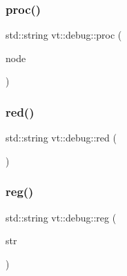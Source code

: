 \mbox{\label{namespacevt_1_1debug_a13a11e278ff8e5a4093396437511aeb7}} 
\subsubsection{\texorpdfstring{proc()}{proc()}}
{\footnotesize\ttfamily std\+::string vt\+::debug\+::proc (\begin{DoxyParamCaption}\item[{\hyperlink{namespacevt_a866da9d0efc19c0a1ce79e9e492f47e2}{vt\+::\+Node\+Type} const \&}]{node }\end{DoxyParamCaption})\hspace{0.3cm}{\ttfamily [inline]}}

\mbox{\label{namespacevt_1_1debug_a6b162f2ca1d964d7cf05c4079d5554a0}} 
\subsubsection{\texorpdfstring{red()}{red()}}
{\footnotesize\ttfamily std\+::string vt\+::debug\+::red (\begin{DoxyParamCaption}{ }\end{DoxyParamCaption})\hspace{0.3cm}{\ttfamily [inline]}}

\mbox{\label{namespacevt_1_1debug_a394711b7d26f45a51bf46c86032742f1}} 
\subsubsection{\texorpdfstring{reg()}{reg()}}
{\footnotesize\ttfamily std\+::string vt\+::debug\+::reg (\begin{DoxyParamCaption}\item[{std\+::string}]{str }\end{DoxyParamCaption})\hspace{0.3cm}{\ttfamily [inline]}}

\mbox{\label{namespacevt_1_1debug_a4456c051bd468fe024334f24887867af}} 
